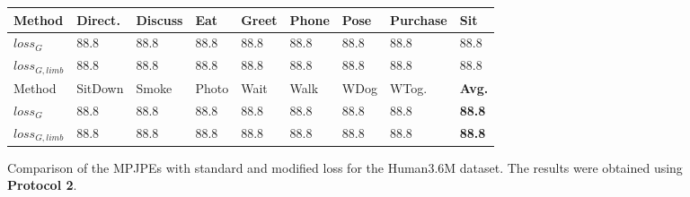 \begin{figure}[bt]	
	\centering
	\begin{tabularx}{\textwidth}{l *{8}{Y}}
		\toprule
		Method & Direct. & Discuss & Eat & Greet & Phone & Pose & Purchase & Sit \\
		\midrule
		$loss_G$ & 88.8 & 88.8 & 88.8 & 88.8 & 88.8 & 88.8 & 88.8 & 88.8\\
		$loss_{G, limb}$ & 88.8 & 88.8 & 88.8 & 88.8 & 88.8 & 88.8 & 88.8 & 88.8 \\
		\bottomrule
		\toprule
		Method & SitDown & Smoke & Photo & Wait & Walk & WDog & WTog. & \textbf{Avg.}\\
		\midrule
		$loss_G$ & 88.8 & 88.8 & 88.8 & 88.8 & 88.8 & 88.8 & 88.8 & \textbf{88.8} \\
		$loss_{G, limb}$ & 88.8 & 88.8 & 88.8 & 88.8 & 88.8 & 88.8 & 88.8 & \textbf{88.8} \\
		\bottomrule
	\end{tabularx}
	\caption{
		Comparison of the MPJPEs with standard and modified loss for the Human3.6M dataset. 
		The results were obtained using \textbf{Protocol 2}.
	 }
	\label{fig:results-limb-loss}
\end{figure}
